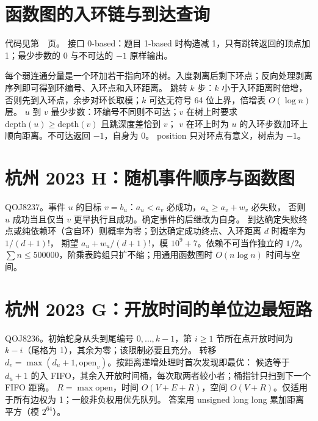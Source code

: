 \section{函数图的入环链与到达查询}\label{knowledge-functional-graph}
代码见第~\pageref{compact-FunctionalGraph}~页。
接口 0-based：题目 1-based 时构造减 1，只有跳转返回的顶点加 1；最少步数的 0 与不可达的 $-1$ 原样输出。

每个弱连通分量是一个环加若干指向环的树。入度剥离后剩下环点；反向处理剥离序列即可得到环编号、入环点和入环距离。
跳转 $k$ 步：$k$ 小于入环距离时倍增，否则先到入环点，余步对环长取模；$k$ 可达无符号 64 位上界，倍增表 $O(\log n)$ 层。
$u$ 到 $v$ 最少步数：环编号不同则不可达；$v$ 在树上时要求 $\mathrm{depth}(u)\ge\mathrm{depth}(v)$ 且跳深度差恰到 $v$；
$v$ 在环上时为 $u$ 的入环步数加环上顺向距离。不可达返回 $-1$，自身为 0。
position 只对环点有意义，树点为 $-1$。

\clearpage
\section{杭州 2023 H：随机事件顺序与函数图}\label{knowledge-hangzhou-h}
QOJ8237。事件 $u$ 的目标 $v=b_u$：$a_u<a_v$ 必成功，$a_u\ge a_v+w_v$ 必失败，
否则 $u$ 成功当且仅当 $v$ 更早执行且成功。确定事件的后继改为自身。
到达确定失败终点或纯依赖环（含自环）则概率为零；到达确定成功终点、入环距离 $d$ 时概率为 $1/(d+1)!$，
期望 $a_u+w_u/(d+1)!$，模 $10^9+7$。依赖不可当作独立的 $1/2$。
$\sum n\le500000$，阶乘表跨组只扩不缩；用通用函数图时 $O(n\log n)$ 时间与空间。

\newpage
\section{杭州 2023 G：开放时间的单位边最短路}\label{knowledge-hangzhou-g}
\label{app:hangzhou2023g}
QOJ8236。初始蛇身从头到尾编号 $0,\ldots,k-1$，第 $i\ge1$ 节所在点开放时间为 $k-i$（尾格为 1），其余为零；该限制必要且充分。
转移 $d_v=\max(d_u+1,\mathrm{open}_v)$。按距离递增处理时首次发现即最优：
候选等于 $d_u+1$ 的入 FIFO，其余入开放时间桶，每次取两者较小者；桶指针只扫到下一个 FIFO 距离。
$R=\max\mathrm{open}$，时间 $O(V+E+R)$，空间 $O(V+R)$。仅适用于所有边权为 1；一般非负权用优先队列。
答案用 unsigned long long 累加距离平方（模 $2^{64}$）。
